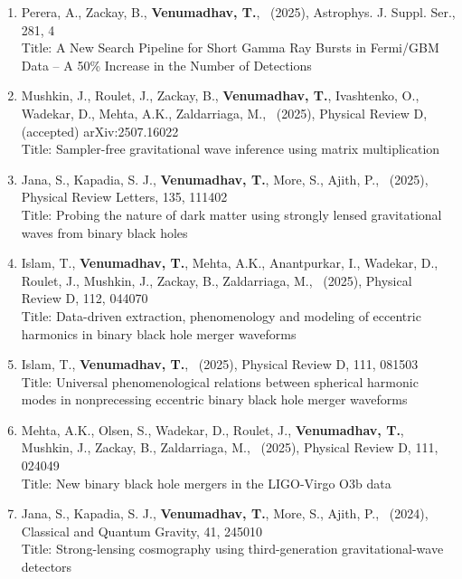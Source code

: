 \documentclass{article}
\newcommand{\apjs}{Astrophys. J. Suppl. Ser.}
\newcommand{\cqg}{Classical and Quantum Gravity}
\newcommand{\prd}{Physical Review D}
\newcommand{\prl}{Physical Review Letters}
\newlength{\cvindent}
\newenvironment{cvblock}{\noindent\hspace*{\cvindent}\begin{minipage}{\dimexpr\textwidth-\cvindent\relax}}{\end{minipage}\par}
\begin{document}
\begin{cvblock}
	\begin{enumerate}
	      \item Perera, A., Zackay, B., \textbf{Venumadhav, T.}, \ (2025), \apjs, 281, 4 \\
	      Title: A New Search Pipeline for Short Gamma Ray Bursts in Fermi/GBM Data -- A 50\% Increase in the Number of Detections
	      \item Mushkin, J., Roulet, J., Zackay, B., \textbf{Venumadhav, T.}, Ivashtenko, O., Wadekar, D., Mehta, A.K., Zaldarriaga, M., \ (2025), \prd, (accepted) arXiv:2507.16022 \\
	      Title: Sampler-free gravitational wave inference using matrix multiplication
	      \item Jana, S., Kapadia, S. J., \textbf{Venumadhav, T.}, More, S., Ajith, P., \ (2025), \prl, 135, 111402 \\
	      Title: Probing the nature of dark matter using strongly lensed gravitational waves from binary black holes
	      \item Islam, T., \textbf{Venumadhav, T.}, Mehta, A.K., Anantpurkar, I., Wadekar, D., Roulet, J., Mushkin, J., Zackay, B., Zaldarriaga, M., \ (2025), \prd, 112, 044070 \\
	      Title: Data-driven extraction, phenomenology and modeling of eccentric harmonics in binary black hole merger waveforms
	      \item Islam, T., \textbf{Venumadhav, T.}, \ (2025), \prd, 111, 081503 \\
	      Title: Universal phenomenological relations between spherical harmonic modes in nonprecessing eccentric binary black hole merger waveforms
	      \item Mehta, A.K., Olsen, S., Wadekar, D., Roulet, J., \textbf{Venumadhav, T.}, Mushkin, J., Zackay, B., Zaldarriaga, M., \ (2025), \prd, 111, 024049 \\
	      Title: New binary black hole mergers in the LIGO-Virgo O3b data
	      \item Jana, S., Kapadia, S. J., \textbf{Venumadhav, T.}, More, S., Ajith, P., \ (2024), \cqg, 41, 245010 \\
	      Title: Strong-lensing cosmography using third-generation gravitational-wave detectors

\end{enumerate}
\end{cvblock}
\end{document}
